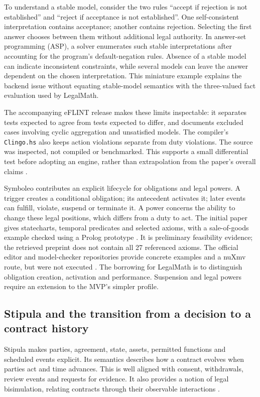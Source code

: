 To understand a stable model, consider the two rules ``accept if rejection is
not established'' and ``reject if acceptance is not established''. One
self-consistent interpretation contains acceptance; another contains rejection.
Selecting the first answer chooses between them without additional legal
authority. In answer-set programming (ASP), a solver enumerates such stable
interpretations after accounting for the program's default-negation rules.
Absence of a stable model can indicate inconsistent constraints, while several models can leave
the answer dependent on the chosen interpretation. This miniature example
explains the backend issue without equating stable-model semantics with the
three-valued fact evaluation used by LegalMath.

The accompanying eFLINT release makes these limits inspectable: it separates
tests expected to agree from tests expected to differ, and documents excluded
cases involving cyclic aggregation and unsatisfied models. The compiler's
\texttt{Clingo.hs} also keeps action violations separate from duty violations.
The source was inspected, not compiled or benchmarked. This supports a small
differential test before adopting an engine, rather than extrapolation from the
paper's overall claims \citep{eflintartifact}.

Symboleo contributes an explicit lifecycle for obligations and legal powers.
A trigger creates a conditional obligation; its antecedent activates it; later
events can fulfill, violate, suspend or terminate it. A power concerns the ability
to change these legal positions, which differs from a duty to act. The initial
paper gives statecharts, temporal predicates and selected axioms, with a
sale-of-goods example checked using a Prolog prototype
\citep[secs.~III--IV]{symboleo2020}. It is preliminary feasibility evidence;
the retrieved preprint does not contain all 27 referenced axioms. The official
editor and model-checker repositories provide concrete examples and a nuXmv
route, but were not executed \citep{symboleocode}. The borrowing for LegalMath
is to distinguish obligation creation, activation and performance. Suspension
and legal powers require an extension to the MVP's simpler profile.

\subsection{Stipula and the transition from a decision to a contract history}

Stipula makes parties, agreement, state, assets, permitted functions and scheduled
events explicit. Its semantics describes how a contract evolves when parties act
and time advances. This is well aligned with consent, withdrawals, review events
and requests for evidence. It also provides a notion of legal bisimulation,
relating contracts through their observable interactions
\citep[secs.~3--5]{stipula2021}.


